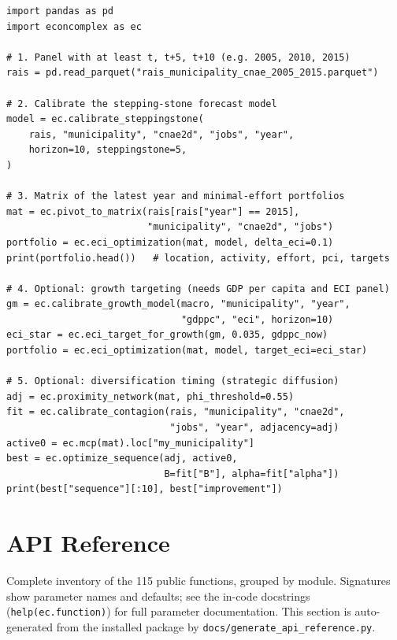 \documentclass[12pt, a4paper]{article}
\begin{document}
\begin{lstlisting}[caption={ECI Optimization end to end}]
import pandas as pd
import econcomplex as ec

# 1. Panel with at least t, t+5, t+10 (e.g. 2005, 2010, 2015)
rais = pd.read_parquet("rais_municipality_cnae_2005_2015.parquet")

# 2. Calibrate the stepping-stone forecast model
model = ec.calibrate_steppingstone(
    rais, "municipality", "cnae2d", "jobs", "year",
    horizon=10, steppingstone=5,
)

# 3. Matrix of the latest year and minimal-effort portfolios
mat = ec.pivot_to_matrix(rais[rais["year"] == 2015],
                         "municipality", "cnae2d", "jobs")
portfolio = ec.eci_optimization(mat, model, delta_eci=0.1)
print(portfolio.head())   # location, activity, effort, pci, targets

# 4. Optional: growth targeting (needs GDP per capita and ECI panel)
gm = ec.calibrate_growth_model(macro, "municipality", "year",
                               "gdppc", "eci", horizon=10)
eci_star = ec.eci_target_for_growth(gm, 0.035, gdppc_now)
portfolio = ec.eci_optimization(mat, model, target_eci=eci_star)

# 5. Optional: diversification timing (strategic diffusion)
adj = ec.proximity_network(mat, phi_threshold=0.55)
fit = ec.calibrate_contagion(rais, "municipality", "cnae2d",
                             "jobs", "year", adjacency=adj)
active0 = ec.mcp(mat).loc["my_municipality"]
best = ec.optimize_sequence(adj, active0,
                            B=fit["B"], alpha=fit["alpha"])
print(best["sequence"][:10], best["improvement"])
\end{lstlisting}

\section{API Reference}

\begin{sloppypar}
Complete inventory of the 115 public functions, grouped by module.
Signatures show parameter names and defaults; see the in-code
docstrings (\texttt{help(ec.function)}) for full parameter
documentation. This section is auto-generated from the installed
package by \texttt{docs/generate\_api\_reference.py}.
\end{sloppypar}


\end{document}

